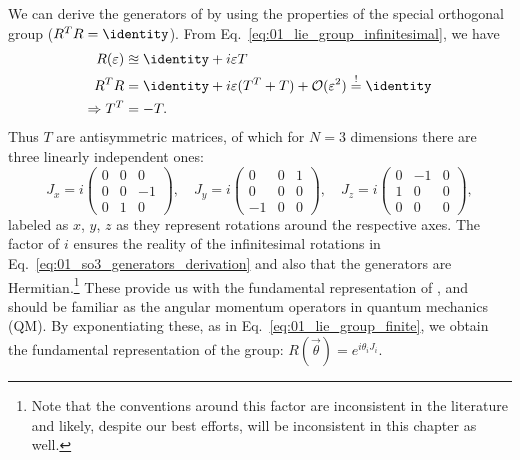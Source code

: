We can derive the generators of \SO[3] by using the properties of the special orthogonal group ($R^TR=\identity$).
From Eq.~\ref{eq:01_lie_group_infinitesimal}, we have
\begin{equation} 
	\begin{split}
	\label{eq:01_so3_generators_derivation}
	R(\varepsilon) &\approxeq \identity + i \varepsilon T \\
	R^TR &= \identity + i \varepsilon (T^T + T) + \mathcal O(\varepsilon^2) \mustequal \identity \\
	\Rightarrow T^T &= -T.
\end{split} 
\end{equation}
Thus $T$ are antisymmetric matrices, of which for $N = 3$ dimensions there are three linearly independent ones:
\begin{equation}
	\label{eq:01_so3_generators}
	J_x = i\begin{pmatrix}
		0 & 0 & 0 \\
		0 & 0 & -1 \\
		0 & 1 & 0
	\end{pmatrix}, \quad
	J_y = i\begin{pmatrix}
		0 & 0 & 1 \\
		0 & 0 & 0 \\
		-1 & 0 & 0
	\end{pmatrix}, \quad
	J_z = i\begin{pmatrix}
		0 & -1 & 0 \\
		1 & 0 & 0 \\
		0 & 0 & 0
	\end{pmatrix},
\end{equation}
labeled as $x$, $y$, $z$ as they represent rotations around the respective axes.
The factor of $i$ ensures the reality of the infinitesimal rotations in Eq.~\ref{eq:01_so3_generators_derivation} and also that the generators are Hermitian.\footnote{Note that the conventions around this factor are inconsistent in the literature and likely, despite our best efforts, will be inconsistent in this chapter as well.}
These provide us with the fundamental representation of \so[3], and should be familiar as the angular momentum operators in quantum mechanics (QM).
By exponentiating these, as in Eq.~\ref{eq:01_lie_group_finite}, we obtain the fundamental representation of the \SO[3] group: $R(\vec{\theta}) = e^{i\theta_i J_i}$.

